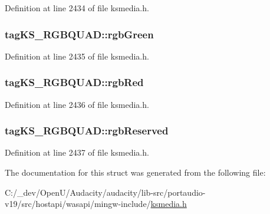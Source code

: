 Definition at line 2434 of file ksmedia.\+h.

\subsubsection[{\texorpdfstring{rgb\+Green}{rgbGreen}}]{ tag\+K\+S\+\_\+\+R\+G\+B\+Q\+U\+A\+D\+::rgb\+Green}\hypertarget{structtag_k_s___r_g_b_q_u_a_d_ae8d0c37aacb96c06bf371a12ea9d8ec2}{}\label{structtag_k_s___r_g_b_q_u_a_d_ae8d0c37aacb96c06bf371a12ea9d8ec2}


Definition at line 2435 of file ksmedia.\+h.

\subsubsection[{\texorpdfstring{rgb\+Red}{rgbRed}}]{ tag\+K\+S\+\_\+\+R\+G\+B\+Q\+U\+A\+D\+::rgb\+Red}\hypertarget{structtag_k_s___r_g_b_q_u_a_d_af66dc1cfd7c8b22ef1072893439d1fb3}{}\label{structtag_k_s___r_g_b_q_u_a_d_af66dc1cfd7c8b22ef1072893439d1fb3}


Definition at line 2436 of file ksmedia.\+h.

\subsubsection[{\texorpdfstring{rgb\+Reserved}{rgbReserved}}]{ tag\+K\+S\+\_\+\+R\+G\+B\+Q\+U\+A\+D\+::rgb\+Reserved}\hypertarget{structtag_k_s___r_g_b_q_u_a_d_a330618ebd97c30b22d649e9db6708b81}{}\label{structtag_k_s___r_g_b_q_u_a_d_a330618ebd97c30b22d649e9db6708b81}


Definition at line 2437 of file ksmedia.\+h.



The documentation for this struct was generated from the following file\+:\begin{DoxyCompactItemize}
\item 
C\+:/\+\_\+dev/\+Open\+U/\+Audacity/audacity/lib-\/src/portaudio-\/v19/src/hostapi/wasapi/mingw-\/include/\hyperlink{ksmedia_8h}{ksmedia.\+h}\end{DoxyCompactItemize}
